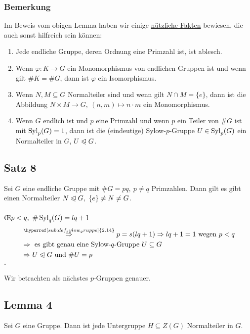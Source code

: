 \subsubsection*{Bemerkung}
Im Beweis vom obigen Lemma haben wir einige \uline{nützliche Fakten} bewiesen, die auch sonst hilfreich sein können:
\begin{enumerate}[(1)]
	\item Jede endliche Gruppe, deren Ordnung eine Primzahl ist, ist ablesch.
	\item Wenn $\varphi:K\to G$ ein Monomorphismus von endlichen Gruppen ist und wenn gilt $\#K=\#G$, dann ist $\varphi$ ein Isomorphismus.
	\item Wenn $N,M\subseteq G$ Normalteiler sind und wenn gilt $N\cap M=\{e\}$, dann ist die Abbildung $N\times M\to G,~(n,m)\mapsto n\cdot m$ ein Monomorphismus.
	\item Wenn $G$ endlich ist und $p$ eine Primzahl und wenn $p$ ein Teiler von $\#G$ ist mit $\operatorname{Syl}_p(G)=1$, dann ist die (eindeutige) Sylow-$p$-Gruppe $U\in \operatorname{Syl}_p(G)$ ein Normalteiler in $G$, $U\trianglelefteqslant G$.
\end{enumerate}


\subsection{Satz 8}
\label{sub:satz_8}
Sei $G$ eine endliche Gruppe mit $\#G=pq,~p\not=q$ Primzahlen.
Dann gilt es gibt einen Normalteiler $N\trianglelefteqslant G,~\{e\}\not=N\not=G$.\\

\\
\OE $p<q,~\#\operatorname{Syl}_q(G)=lq+1$
\begin{equation*}
\begin{aligned}
	&\stackrel{\hyperref[sub:def_sylow_gruppe]{2.14}}{\Rightarrow} p=s(lq+1) \Rightarrow lq+1=1 \text{ wegen } p<q\\
	&\Rightarrow \text{ es gibt genau eine Sylow-$q$-Gruppe } U\subseteq G\\
	&\Rightarrow U\nt G\text{ und } \#U=p
\end{aligned}
\end{equation*}
\hfill $\square$

Wir betrachten als nächstes $p$-Gruppen genauer.\\

\subsection{Lemma 4}
\label{sub:lemma_4}
Sei $G$ eine Gruppe. 
Dann ist jede Untergruppe $H\subseteq Z(G)$ Normalteiler in $G$.\\

